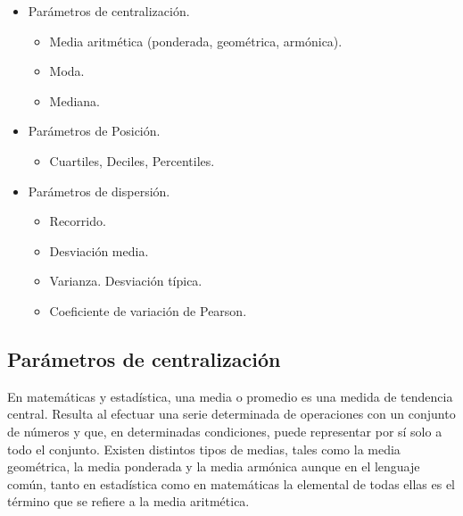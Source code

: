 \begin{adjustwidth}{20pt}{0pt}
\begin{itemize}
	\vspace{-2mm} \item Parámetros de centralización.
		\vspace{-2mm} \begin{itemize}
			\vspace{-1mm} \item Media aritmética (ponderada, geométrica, armónica).
			\vspace{-1mm} \item Moda.
			\vspace{-1mm} \item Mediana.
		\end{itemize}
	\vspace{-2mm} \item Parámetros de Posición.
		\begin{itemize}
			\vspace{-2mm} \item Cuartiles, Deciles, Percentiles.
		\end{itemize}
	\vspace{-2mm} \item Parámetros de dispersión.	
		\begin{itemize}
			\vspace{-1mm} \item Recorrido.
			\vspace{-1mm} \item Desviación media.
			\vspace{-1mm} \item Varianza. Desviación típica.
			\vspace{-1mm} \item Coeficiente de variación de Pearson.
		\end{itemize}
\end{itemize}
\end{adjustwidth}




\subsection{Parámetros de centralización}

\small{En matemáticas y estadística, una media o promedio es una medida de tendencia central. Resulta al efectuar una serie determinada de operaciones con un conjunto de números y que, en determinadas condiciones, puede representar por sí solo a todo el conjunto. Existen distintos tipos de medias, tales como la media geométrica, la media ponderada y la media armónica aunque en el lenguaje común, tanto en estadística como en matemáticas la elemental de todas ellas es el término que se refiere a la media aritmética.}

